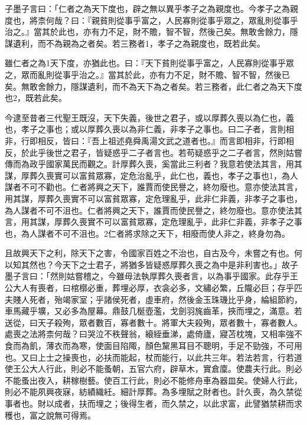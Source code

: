 
\begin{pinyinscope}
子墨子言曰：「仁者之為天下度也，辟之無以異乎孝子之為親度也。今孝子之為親度也，將柰何哉？曰：『親貧則從事乎富之，人民寡則從事乎眾之，眾亂則從事乎治之。』當其於此也，亦有力不足，財不贍，智不智，然後己矣。無敢舍餘力，隱謀遺利，而不為親為之者矣。若三務者1，孝子之為親度也，既若此矣。

雖仁者之為1天下度，亦猶此也。曰：『天下貧則從事乎富之，人民寡則從事乎眾之，眾而亂則從事乎治之。』當其於此，亦有力不足，財不贍、智不智，然後已矣。無敢舍餘力，隱謀遺利，而不為天下為之者矣。若三務者，此仁者之為天下度也2，既若此矣。

今逮至昔者三代聖王既沒，天下失義，後世之君子，或以厚葬久喪以為仁也，義也，孝子之事也；或以厚葬久喪以為非仁義，非孝子之事也。曰二子者，言則相非，行即相反，皆曰：『吾上祖述堯舜禹湯文武之道者也。』而言即相非，行即相反，於此乎後世之君子，皆疑惑乎二子者言也。若苟疑惑乎之二子者言，然則姑嘗傳而為政乎國家萬民而觀之。計厚葬久喪，奚當此三利者？我意若使法其言，用其謀，厚葬久喪實可以富貧眾寡，定危治亂乎，此仁也，義也，孝子之事也1，為人謀者不可不勸也。仁者將興之天下，誰賈而使民譽之，終勿廢也。意亦使法其言，用其謀，厚葬久喪實不可以富貧眾寡，定危理亂乎，此非仁非義，非孝子之事也，為人謀者不可不沮也。仁者將興之天下，誰賈而使民譽之，終勿廢也。意亦使法其言，用其謀，厚葬久喪實不可以富貧眾寡，定危理亂乎，此非仁非義，非孝子之事也，為人謀者不可不沮也。2仁者將求除之天下，相廢而使人非之，終身勿為。

且故興天下之利，除天下之害，令國家百姓之不治也，自古及今，未嘗之有也。何以知其然也？今天下之士君子，將猶多皆疑惑厚葬久喪之為中是非利害也。」故子墨子言曰：「然則姑嘗稽之，今雖毋法執厚葬久喪者言，以為事乎國家。此存乎王公大人有喪者，曰棺槨必重，葬埋必厚，衣衾必多，文繡必繁，丘隴必巨；存乎匹夫賤人死者，殆竭家室；乎諸侯死者，虛車府，然後金玉珠璣比乎身，綸組節約，車馬藏乎壙，又必多為屋幕。鼎鼓几梴壺濫，戈劍羽旄齒革，挾而埋之，滿意。若送從，曰天子殺殉，眾者數百，寡者數十。將軍大夫殺殉，眾者數十，寡者數人。處喪之法將柰何哉？曰哭泣不秩聲翁，縗絰垂涕，處倚廬，寢苫枕塊，又相率強不食而為飢，薄衣而為寒，使面目陷陬，顏色黧黑耳目不聰明，手足不勁強，不可用也。又曰上士之操喪也，必扶而能起，杖而能行，以此共三年。若法若言，行若道使王公大人行此，則必不能蚤朝，五官六府，辟草木，實倉廩。使農夫行此。則必不能蚤出夜入，耕稼樹藝。使百工行此，則必不能修舟車為器皿矣。使婦人行此，則必不能夙興夜寐，紡績織紝。細計厚葬。為多埋賦之財者也。計久喪，為久禁從事者也。財以成者，扶而埋之；後得生者，而久禁之，以此求富，此譬猶禁耕而求穫也，富之說無可得焉。


\end{pinyinscope}
